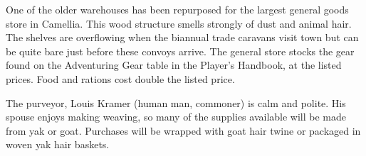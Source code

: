 One of the older warehouses has been repurposed for the largest general goods store in Camellia.
This wood structure smells strongly of dust and animal hair.
The shelves are overflowing when the biannual trade caravans visit town but can be quite bare just before these convoys arrive.
The general store stocks the gear found on the Adventuring Gear table in the Player's Handbook, at the listed prices.
Food and rations cost double the listed price.

The purveyor, Louis Kramer (human man, commoner) is calm and polite.
His spouse enjoys making weaving, so many of the supplies available will be made from yak or goat.
Purchases will be wrapped with goat hair twine or packaged in woven yak hair baskets.
